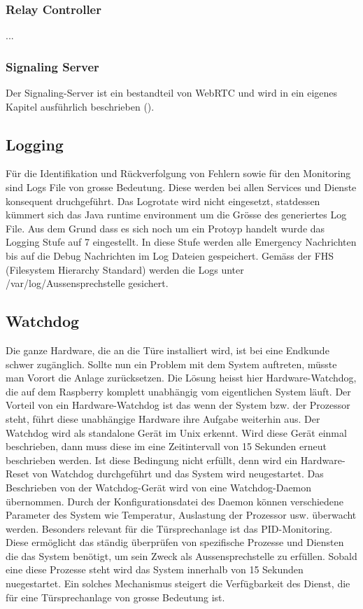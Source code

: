 \subsubsection{Relay Controller}
...
\subsubsection{Signaling Server}
Der Signaling-Server ist ein bestandteil von WebRTC und wird in ein eigenes Kapitel ausführlich beschrieben ().

\subsection{Logging}
\label{kap:logs}
Für die Identifikation und Rückverfolgung von Fehlern sowie für den Monitoring sind Logs File von grosse Bedeutung. Diese werden bei allen Services und Dienste konsequent druchgeführt. Das Logrotate wird nicht eingesetzt, statdessen kümmert sich das Java runtime environment um die Grösse des generiertes Log File. Aus dem Grund dass es sich noch um ein Protoyp handelt wurde das Logging Stufe auf 7 eingestellt. In diese Stufe werden alle Emergency Nachrichten bis auf die Debug Nachrichten im Log Dateien gespeichert.
Gemäss der FHS (Filesystem Hierarchy Standard) werden die Logs unter /var/log/Aussensprechstelle gesichert. 

\subsection{Watchdog}
\label{kap:watchdog}
Die ganze Hardware, die an die Türe installiert wird, ist bei eine Endkunde schwer zugänglich. Sollte nun ein Problem mit dem System auftreten, müsste man Vorort die Anlage zurücksetzen. Die Lösung heisst hier Hardware-Watchdog, die auf dem Raspberry komplett unabhängig vom eigentlichen System läuft. Der Vorteil von ein Hardware-Watchdog ist das wenn der System bzw. der Prozessor steht, führt diese unabhängige Hardware ihre Aufgabe weiterhin aus.
Der Watchdog wird als standalone Gerät im Unix erkennt. Wird diese Gerät einmal beschrieben, dann muss diese im eine Zeitintervall von 15 Sekunden erneut beschrieben werden. Ist diese Bedingung nicht erfüllt, denn wird ein Hardware-Reset von Watchdog durchgeführt und das System wird neugestartet.
Das Beschrieben von der Watchdog-Gerät wird von eine Watchdog-Daemon übernommen. 
Durch der Konfigurationsdatei des Daemon können verschiedene Parameter des System wie Temperatur, Auslastung der Prozessor usw. überwacht werden. Besonders relevant für die Türsprechanlage ist das PID-Monitoring. Diese ermöglicht das ständig überprüfen von spezifische Prozesse und Diensten die das System benötigt, um sein Zweck als Aussensprechstelle zu erfüllen. Sobald eine diese Prozesse steht wird das System innerhalb von 15 Sekunden nuegestartet. 
Ein solches Mechanismus steigert die Verfügbarkeit des Dienst, die für eine Türsprechanlage von grosse Bedeutung ist.
